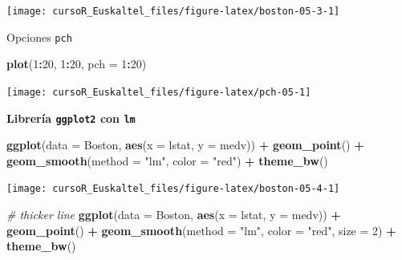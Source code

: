 \documentclass[]{book}
\newenvironment{Shaded}{\begin{snugshade}}{\end{snugshade}}
\newcommand{\KeywordTok}[1]{\textcolor[rgb]{0.13,0.29,0.53}{\textbf{#1}}}
\newcommand{\DataTypeTok}[1]{\textcolor[rgb]{0.13,0.29,0.53}{#1}}
\newcommand{\DecValTok}[1]{\textcolor[rgb]{0.00,0.00,0.81}{#1}}
\newcommand{\StringTok}[1]{\textcolor[rgb]{0.31,0.60,0.02}{#1}}
\newcommand{\CommentTok}[1]{\textcolor[rgb]{0.56,0.35,0.01}{\textit{#1}}}
\newcommand{\OperatorTok}[1]{\textcolor[rgb]{0.81,0.36,0.00}{\textbf{#1}}}
\newcommand{\NormalTok}[1]{#1}
\begin{document}
\begin{center}\texttt{[image: cursoR\_Euskaltel\_files/figure-latex/boston-05-3-1]} \end{center}

Opciones \texttt{pch}

\begin{Shaded}
\begin{Highlighting}[]
\KeywordTok{plot}\NormalTok{(}\DecValTok{1}\OperatorTok{:}\DecValTok{20}\NormalTok{, }\DecValTok{1}\OperatorTok{:}\DecValTok{20}\NormalTok{, }\DataTypeTok{pch =} \DecValTok{1}\OperatorTok{:}\DecValTok{20}\NormalTok{)}
\end{Highlighting}
\end{Shaded}

\begin{center}\texttt{[image: cursoR\_Euskaltel\_files/figure-latex/pch-05-1]} \end{center}

\textbf{Librería \texttt{ggplot2} con \texttt{lm}}

\begin{Shaded}
\begin{Highlighting}[]
\KeywordTok{ggplot}\NormalTok{(}\DataTypeTok{data =}\NormalTok{ Boston, }\KeywordTok{aes}\NormalTok{(}\DataTypeTok{x =}\NormalTok{ lstat, }\DataTypeTok{y =}\NormalTok{ medv)) }\OperatorTok{+}
\StringTok{  }\KeywordTok{geom_point}\NormalTok{() }\OperatorTok{+}
\StringTok{  }\KeywordTok{geom_smooth}\NormalTok{(}\DataTypeTok{method =} \StringTok{"lm"}\NormalTok{, }\DataTypeTok{color =} \StringTok{"red"}\NormalTok{) }\OperatorTok{+}
\StringTok{  }\KeywordTok{theme_bw}\NormalTok{()}
\end{Highlighting}
\end{Shaded}

\begin{center}\texttt{[image: cursoR\_Euskaltel\_files/figure-latex/boston-05-4-1]} \end{center}

\begin{Shaded}
\begin{Highlighting}[]
\CommentTok{# thicker line}
\KeywordTok{ggplot}\NormalTok{(}\DataTypeTok{data =}\NormalTok{ Boston, }\KeywordTok{aes}\NormalTok{(}\DataTypeTok{x =}\NormalTok{ lstat, }\DataTypeTok{y =}\NormalTok{ medv)) }\OperatorTok{+}
\StringTok{  }\KeywordTok{geom_point}\NormalTok{() }\OperatorTok{+}
\StringTok{  }\KeywordTok{geom_smooth}\NormalTok{(}\DataTypeTok{method =} \StringTok{"lm"}\NormalTok{, }\DataTypeTok{color =} \StringTok{"red"}\NormalTok{, }\DataTypeTok{size =} \DecValTok{2}\NormalTok{) }\OperatorTok{+}
\StringTok{  }\KeywordTok{theme_bw}\NormalTok{()}
\end{Highlighting}
\end{Shaded}
\end{document}
